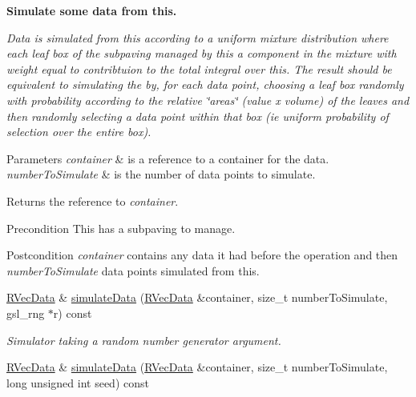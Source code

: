 \begin{Indent}{\bf \-Simulate some data from this.}\par
{\em \-Data is simulated from this according to a uniform mixture distribution where each leaf box of the subpaving managed by this a component in the mixture with weight equal to contribtuion to the total integral over this. \-The result should be equivalent to simulating the by, for each data point, choosing a leaf box randomly with probability according to the relative \char`\"{}areas\char`\"{} (value x volume) of the leaves and then randomly selecting a data point within that box (ie uniform probability of selection over the entire box).


\begin{DoxyParams}{\-Parameters}
{\em container} & is a reference to a container for the data. \\
\hline
{\em number\-To\-Simulate} & is the number of data points to simulate. \\
\hline
\end{DoxyParams}
\begin{DoxyReturn}{\-Returns}
the reference to {\itshape container\/}. 
\end{DoxyReturn}
\begin{DoxyPrecond}{\-Precondition}
\-This has a subpaving to manage. 
\end{DoxyPrecond}
\begin{DoxyPostcond}{\-Postcondition}
{\itshape container\/} contains any data it had before the operation and then {\itshape number\-To\-Simulate\/} data points simulated from this. 
\end{DoxyPostcond}
}\begin{DoxyCompactItemize}
\item 
\hyperlink{namespacesubpavings_a30e15e24c8d81a2160d7422ef3c39d68}{\-R\-Vec\-Data} \& \hyperlink{classsubpavings_1_1PiecewiseConstantFunction_a3fd630a95c48dda0a828bb2229c9d854}{simulate\-Data} (\hyperlink{namespacesubpavings_a30e15e24c8d81a2160d7422ef3c39d68}{\-R\-Vec\-Data} \&container, size\-\_\-t number\-To\-Simulate, gsl\-\_\-rng $\ast$r) const 
\begin{DoxyCompactList}\small\item\em \-Simulator taking a random number generator argument. \end{DoxyCompactList}\item 
\hyperlink{namespacesubpavings_a30e15e24c8d81a2160d7422ef3c39d68}{\-R\-Vec\-Data} \& \hyperlink{classsubpavings_1_1PiecewiseConstantFunction_ad818b3800904d40fbee121f0bea973b5}{simulate\-Data} (\hyperlink{namespacesubpavings_a30e15e24c8d81a2160d7422ef3c39d68}{\-R\-Vec\-Data} \&container, size\-\_\-t number\-To\-Simulate, long unsigned int seed) const 

\end{DoxyCompactItemize}
\end{Indent}
